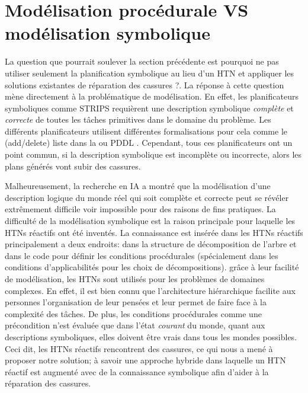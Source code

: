 \documentclass[a4paper,twoside,french]{article}
\begin{document}
		\section {Modélisation procédurale VS modélisation symbolique}
		La question que pourrait soulever la section précédente est pourquoi ne pas utiliser seulement la planification symbolique au lieu d'un HTN et appliquer les solutions existantes de réparation des cassures ?. La réponse à cette question mène directement à la problématique de modélisation. En effet, les planificateurs symboliques comme STRIPS requièrent une description  symbolique {\em complète} et {\em correcte} de toutes les tâches primitives dans le domaine du problème. Les différents planificateurs utilisent différentes formalisations pour cela comme le (add/delete) liste dans la  ou PDDL \cite{ghallab1998pddl}. Cependant, tous ces planificateurs ont un point  commun, si la description symbolique est incomplète ou incorrecte, alors les plans générés vont subir des cassures. 
		\par Malheureusement, la recherche en IA a montré que la modélisation d'une description logique du monde réel qui soit complète et correcte  peut se révéler extrêmement difficile voir impossible  pour des raisons de fins pratiques.  La difficulté de la modélisation symbolique est la raison principale pour laquelle les HTNs réactifs ont été inventés. La connaissance est insérée dans les HTNs réactifs principalement a deux endroits: dans la structure de décomposition de l'arbre et dans le code pour définir les conditions procédurales (spécialement dans les conditions d'applicabilités pour les choix de décompositions). grâce à leur facilité de modélisation, les HTNs sont utilisés pour les  problèmes de domaines complexes. En effet, il est bien connu que l'architecture hiérarchique facilite aux personnes l'organisation de leur pensées et leur permet de faire face à la complexité des tâches. De plus, les conditions procédurales comme une précondition n'est évaluée que dans l'état {\em courant} du monde, quant aux descriptions symboliques, elles doivent être vrais dans tous les mondes possibles. Ceci dit, les HTNs réactifs rencontrent des cassures, ce qui nous a mené à proposer notre solution; à savoir une approche hybride dans laquelle un HTN réactif est augmenté avec de la connaissance symbolique afin d'aider à la réparation des cassures. 
		
\end{document}
